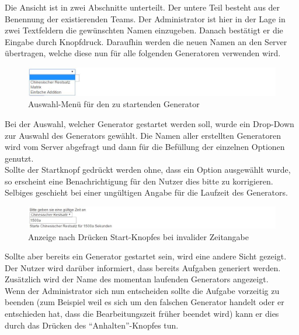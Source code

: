Die Ansicht ist in zwei Abschnitte unterteilt. Der untere Teil besteht aus der Benennung der existierenden Teams. Der Administrator ist hier in der Lage in zwei Textfeldern die gewünschten Namen einzugeben. Danach bestätigt er die Eingabe durch Knopfdruck. Daraufhin werden die neuen Namen an den Server übertragen, welche diese nun für alle folgenden Generatoren verwenden wird. \\

\begin{figure}[htp]     %
\centering
\includegraphics[width=1\textwidth]{bilder/StartDropDown} 
\caption[Auswahl-Menü für den zu startenden Generator]{Auswahl-Menü für den zu startenden Generator}
\end{figure} 

Bei der Auswahl, welcher Generator gestartet werden soll, wurde ein Drop-Down zur Auswahl des Generators gewählt. Die Namen aller erstellten Generatoren wird vom Server abgefragt und dann für die Befüllung der einzelnen Optionen genutzt.\\
Sollte der Startknopf gedrückt werden ohne, dass ein Option ausgewählt wurde, so erscheint eine Benachrichtigung für den Nutzer dies bitte zu korrigieren. Selbiges geschieht bei einer ungültigen Angabe für die Laufzeit des Generators. \\

\begin{figure}[htp]     %
\centering
\includegraphics[width=1\textwidth]{bilder/InvalidTime} 
\caption[Anzeige nach Drücken Start-Knopfes bei invalider Zeitangabe]{Anzeige nach Drücken Start-Knopfes bei invalider Zeitangabe}
\end{figure} 
 

Sollte aber bereits ein Generator gestartet sein, wird eine andere Sicht gezeigt. Der Nutzer wird darüber informiert, dass bereits Aufgaben generiert werden. Zusätzlich wird der Name des momentan laufenden Generators angezeigt.\\
Wenn der Administrator sich nun entscheiden sollte die Aufgabe vorzeitig zu beenden (zum Beispiel weil es sich um den falschen Generator handelt oder er entschieden hat, dass die Bearbeitungszeit früher beendet wird) kann er dies durch das Drücken des ``Anhalten''-Knopfes tun.


